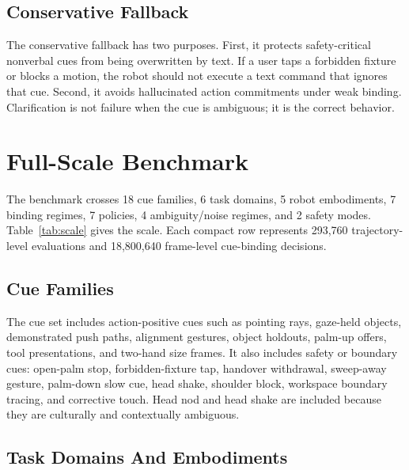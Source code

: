 \documentclass{article}
\begin{document}
\subsection{Conservative Fallback}

The conservative fallback has two purposes. First, it protects safety-critical nonverbal cues from being overwritten by text. If a user taps a forbidden fixture or blocks a motion, the robot should not execute a text command that ignores that cue. Second, it avoids hallucinated action commitments under weak binding. Clarification is not failure when the cue is ambiguous; it is the correct behavior.

\section{Full-Scale Benchmark}

\begin{table}[t]
\centering
\small
\resizebox{\linewidth}{!}{}
\caption{Full-scale benchmark dimensions. Compact rows are deterministic aggregates over seeds, workspace layouts, object sets, cue timing offsets, task trials, and perception frames.}
\label{tab:scale}
\end{table}

The benchmark crosses 18 cue families, 6 task domains, 5 robot embodiments, 7 binding regimes, 7 policies, 4 ambiguity/noise regimes, and 2 safety modes. Table~\ref{tab:scale} gives the scale. Each compact row represents 293,760 trajectory-level evaluations and 18,800,640 frame-level cue-binding decisions.

\subsection{Cue Families}

The cue set includes action-positive cues such as pointing rays, gaze-held objects, demonstrated push paths, alignment gestures, object holdouts, palm-up offers, tool presentations, and two-hand size frames. It also includes safety or boundary cues: open-palm stop, forbidden-fixture tap, handover withdrawal, sweep-away gesture, palm-down slow cue, head shake, shoulder block, workspace boundary tracing, and corrective touch. Head nod and head shake are included because they are culturally and contextually ambiguous.

\subsection{Task Domains And Embodiments}
\end{document}
